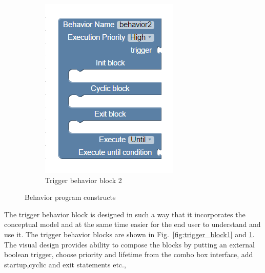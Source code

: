 \begin{figure}[H]
\begin{subfigure}[t]{0.33\textwidth}
\includegraphics[width=\textwidth]{../thesis/assets/blocks_behavior2.png}
\caption[Trigger behavior block 2]{Trigger behavior block 2}
\label{fig:trigger_block2}
\end{subfigure}
\caption[Behavior program constructs]{Behavior program constructs}
\label{fig:behavior_blocks}
\end{figure}
The trigger behavior block is designed in such a way that it incorporates the conceptual model and at the same time easier for the end user to understand and use it. The trigger behavior blocks are shown in Fig.~\ref{fig:trigger_block1} and \ref{fig:trigger_block2}. The visual design provides ability to compose the blocks by putting an external boolean trigger, choose priority and lifetime from the combo box interface, add startup,cyclic and exit statements etc.,
